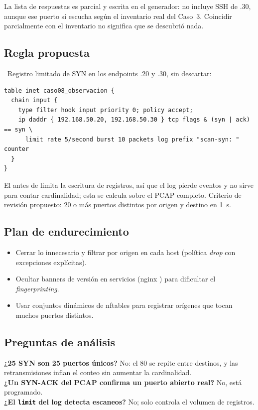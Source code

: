 \fig[0.75]{caso08-portscan.png}{Puertos destino distintos por origen y destino en la ventana [0,1)~s: 20 hacia .20 y 5 hacia .30.}

La lista de respuestas es parcial y escrita en el generador: no incluye SSH de .30, aunque ese puerto sí escucha según el inventario real del Caso~3. Coincidir parcialmente con el inventario no significa que se descubrió nada.

\subsection{Regla propuesta}
\PROP\ Registro limitado de SYN en los endpoints .20 y .30, sin descartar:
\begin{lstlisting}
table inet caso08_observacion {
  chain input {
    type filter hook input priority 0; policy accept;
    ip daddr { 192.168.50.20, 192.168.50.30 } tcp flags & (syn | ack) == syn \
      limit rate 5/second burst 10 packets log prefix "scan-syn: " counter
  }
}
\end{lstlisting}
El  antes de  limita la escritura de registros, así que el log pierde eventos y no sirve para contar cardinalidad; esta se calcula sobre el PCAP completo. Criterio de revisión propuesto: 20 o más puertos distintos por origen y destino en 1~s.

\subsection{Plan de endurecimiento}
\begin{itemize}
\item Cerrar lo innecesario y filtrar por origen en cada host (política \emph{drop} con excepciones explícitas).
\item Ocultar banners de versión en servicios (nginx \cod{server\_tokens off}) para dificultar el \emph{fingerprinting}.
\item Usar conjuntos dinámicos de nftables para registrar orígenes que tocan muchos puertos distintos.
\end{itemize}

\subsection{Preguntas de análisis}
\textbf{¿25 SYN son 25 puertos únicos?} No: el 80 se repite entre destinos, y las retransmisiones inflan el conteo sin aumentar la cardinalidad.\\
\textbf{¿Un SYN-ACK del PCAP confirma un puerto abierto real?} No, está programado.\\
\textbf{¿El \texttt{limit} del log detecta escaneos?} No; solo controla el volumen de registros.


